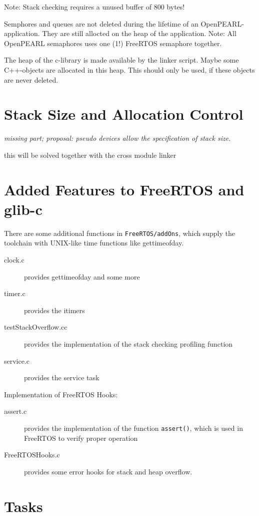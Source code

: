 Note: Stack checking requires a unused buffer of 800 bytes!

Semphores and queues are not deleted during the lifetime of an 
OpenPEARL-application. They are still allocted on the heap of the application.
Note: All OpenPEARL semaphores uses one (1!) FreeRTOS semaphore together.

The heap of the c-library is made available by the linker script. 
Maybe some C++-objects are allocated in this heap.
This should only be used, if these objects are never deleted.


\section{Stack Size and Allocation Control}
{\em missing part; 
proposal: pseudo devices allow the specification of stack size.

this will be solved together with the cross module linker
}

\section{Added Features to FreeRTOS and glib-c}
There are some additional functions in \texttt{FreeRTOS/addOns},
 which supply the toolchain
with UNIX-like time functions like gettimeofday.
\begin{description}
\item[clock.c]provides gettimeofday and some more
\item[timer.c] provides the itimers
\item[testStackOverflow.cc] provides the implementation of the 
  stack checking profiling function
\item[service.c] provides the service task
\end{description}

Implementation of FreeRTOS Hooks:
\begin{description}
\item[assert.c] provides the implementation of the function
  \texttt{assert()}, which is used in FreeRTOS to verify
  proper operation
\item[FreeRTOSHooks.c] provides some error hooks for stack and heap overflow.
\end{description}

\section{Tasks}
\label{freertos_tasking}

